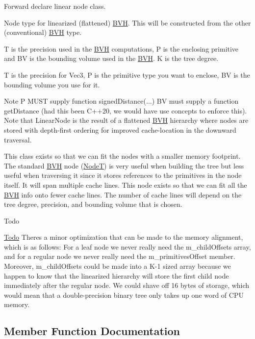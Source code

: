 Forward declare linear node class. 

Node type for linearized (flattened) \hyperlink{namespaceBVH}{B\+VH}. This will be constructed from the other (conventional) \hyperlink{namespaceBVH}{B\+VH} type.

T is the precision used in the \hyperlink{namespaceBVH}{B\+VH} computations, P is the enclosing primitive and BV is the bounding volume used in the \hyperlink{namespaceBVH}{B\+VH}. K is the tree degree.

T is the precision for Vec3, P is the primitive type you want to enclose, BV is the bounding volume you use for it.

\begin{DoxyNote}{Note}
P M\+U\+ST supply function signed\+Distance(...) BV must supply a function get\+Distance (had this been C++20, we would have use concepts to enforce this). Note that Linear\+Node is the result of a flattened \hyperlink{namespaceBVH}{B\+VH} hierarchy where nodes are stored with depth-\/first ordering for improved cache-\/location in the downward traversal.

This class exists so that we can fit the nodes with a smaller memory footprint. The standard \hyperlink{namespaceBVH}{B\+VH} node (\hyperlink{classBVH_1_1NodeT}{NodeT}) is very useful when building the tree but less useful when traversing it since it stores references to the primitives in the node itself. It will span multiple cache lines. This node exists so that we can fit all the \hyperlink{namespaceBVH}{B\+VH} info onto fewer cache lines. The number of cache lines will depend on the tree degree, precision, and bounding volume that is chosen.
\end{DoxyNote}
\begin{DoxyRefDesc}{Todo}
\item[\hyperlink{todo__todo000001}{Todo}]There\textquotesingle{}s a minor optimization that can be made to the memory alignment, which is as follows\+: For a leaf node we never really need the m\+\_\+child\+Offsets array, and for a regular node we never really need the m\+\_\+primitives\+Offset member. Moreover, m\+\_\+child\+Offsets could be made into a K-\/1 sized array because we happen to know that the linearized hierarchy will store the first child node immediately after the regular node. We could shave off 16 bytes of storage, which would mean that a double-\/precision binary tree only takes up one word of C\+PU memory. \end{DoxyRefDesc}


\subsection{Member Function Documentation}
\mbox{\label{classBVH_1_1LinearNodeT_af08feacbaa148425a896c196b0b6d1da}} 
